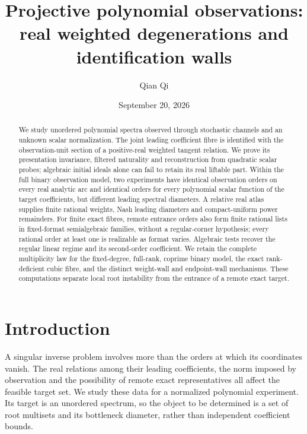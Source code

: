 
\title[Real weighted degenerations and identification walls]{Projective polynomial observations:\\ real weighted degenerations and identification walls}
\author{Qian Qi}
\date{September 20, 2026}

\begin{abstract}
We study unordered polynomial spectra observed through stochastic channels
and an unknown scalar normalization. The joint leading coefficient fibre
is identified with the observation-unit section of a positive-real weighted
tangent relation. We prove its presentation invariance, filtered
naturality and reconstruction from quadratic scalar probes; algebraic
initial ideals alone can fail to retain its real liftable part. Within the
full binary observation model, two experiments have identical observation
orders on every real analytic arc and identical orders for every polynomial
scalar function of the target coefficients, but different leading spectral
diameters. A relative real atlas supplies finite rational weights, Nash
leading diameters and compact-uniform power remainders. For finite exact
fibres, remote entrance orders also form finite rational lists in
fixed-format semialgebraic families, without a regular-corner hypothesis;
every rational order at least one is realizable as format varies.
Algebraic tests recover the regular linear regime and its second-order
coefficient. We retain the complete multiplicity law for the fixed-degree,
full-rank, coprime binary model, the exact rank-deficient cubic fibre, and
the distinct weight-wall and endpoint-wall mechanisms. These computations
separate local root instability from the entrance of a remote exact target.
\end{abstract}
\maketitle

\section{Introduction}
A singular inverse problem involves more than the orders at which its
coordinates vanish. The real relations among their leading coefficients,
the norm imposed by observation and the possibility of remote exact
representatives all affect the feasible target set. We study these data
for a normalized polynomial experiment. Its target is an unordered
spectrum, so the object to be determined is a set of root multisets and
its bottleneck diameter, rather than independent coefficient bounds.

